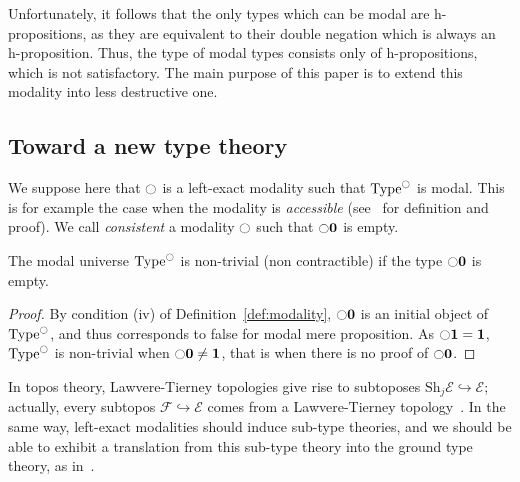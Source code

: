 \documentclass[notfinal]{jfrarticle}
\DeclareMathOperator{\Type}{Type}
\newcommand{\modal}{\ensuremath{\ocircle}}
\newcommand \Sh[1] {\mathrm{Sh}_{#1}}
\newcommand \zero {\mathbf{0}}
\newcommand \one {\mathbf{1}}
\begin{document}
Unfortunately, it follows that the only types which can be modal are
h-propositions, as they are equivalent to their double negation which
is always an h-proposition. Thus, the type of modal types consists
only of h-propositions, which is not satisfactory. The main purpose of this
paper is to extend this
modality into less destructive one.

\subsection{Toward a new type theory}
\label{ssec:new-type-theories}


We suppose here that $\modal$ is a left-exact modality such that
$\Type^\modal$ is modal.
This is for example the case when the modality is {\em accessible}
(see~\cite{hottlib} for definition and proof).
We call {\em consistent} a modality $\modal$ such that $\modal\zero$
is empty.
\begin{prop}
  The modal universe $\Type^\modal$ is non-trivial (non contractible) if the type $\modal
  \zero$ is empty.
\end{prop}
\begin{proof}
  By condition (iv) of Definition~\ref{def:modality},
  $\modal \zero$ is an initial object of $\Type^\modal$, and thus
  corresponds to false for modal mere proposition.
  As $\modal \one = \one$, $\Type^\modal$ is non-trivial when
  $\modal \zero \neq \one$, that is when there is no proof of
  $\modal \zero$.
\end{proof}

In topos theory, Lawvere-Tierney topologies give rise to subtoposes
$\Sh{j}\mathcal E \hookrightarrow \mathcal E$; actually, every
subtopos $\mathcal F \hookrightarrow \mathcal E$ comes from a
Lawvere-Tierney topology~\cite[Corollary VII.4.7]{maclanemoerdijk}.
In the same way, left-exact modalities should induce sub-type
theories, and we should be able to exhibit a translation from this
sub-type theory into the ground type theory, as in~\cite{forcing2016}.

\end{document}
